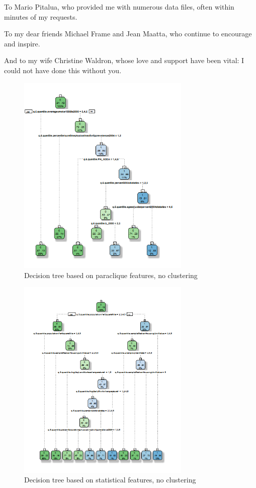 \documentclass[conference,compsoc]{IEEEtran}
\begin{document}
To Mario Pitalua, who provided me with numerous data files, often within minutes of my requests.

To my dear friends Michael Frame and Jean Maatta, who continue to encourage and inspire.

And to my wife Christine Waldron, whose love and support have been vital: I could not have done this without you.


\begin{figure}[!t]
\centering
\includegraphics[width=3.25in]{decision-tree-01-paraclique-no-clustering.png}
\caption{Decision tree based on paraclique features, no clustering}
\label{decision.tree.01}
\end{figure}

\begin{figure}[!t]
\centering
\includegraphics[width=3.25in]{decision-tree-02-all-no-clustering.png}
\caption{Decision tree based on statistical features, no clustering}
\label{decision.tree.02}
\end{figure}
\end{document}
